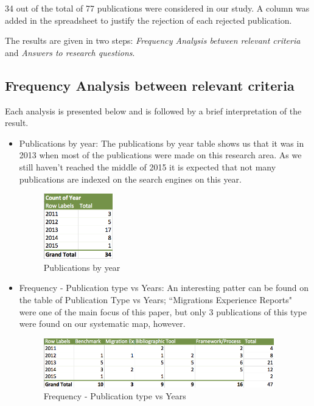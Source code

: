 \documentclass{article}
\begin{document}
34 out of the total of 77 publications were considered in our study. A column was added in the spreadsheet to justify the rejection of each rejected publication.

The results are given in two steps: \textit{Frequency Analysis between relevant criteria} and \textit{Answers to research questions}. 

\subsection{Frequency Analysis between relevant criteria}
\label{frequencyAnalysis}

Each analysis is presented below and is followed by a brief interpretation of the result. 



\begin{itemize}
\item{Publications by year: }
The publications by year table shows us that it was in 2013 when most of the publications were made on this research area. As we still haven't reached  the middle of 2015 it is expected that not many publications are indexed on the search engines on this year.
\begin{figure}[htb!]
\centering
\includegraphics[width=30mm]{graph2.png}
\caption{Publications by year}
\end{figure}



\item {Frequency - Publication type vs Years: }
An interesting patter can be found on the table of Publication Type vs Years; ``Migrations Experience Reports" were one of the main focus of this paper, but only 3 publications of this type were found on our systematic map, however. 

\begin{figure}[htb!]
\centering
\includegraphics[width=100mm]{graph1.png}
\caption{Frequency - Publication type vs Years}
\end{figure}



\end{itemize}
\end{document}
